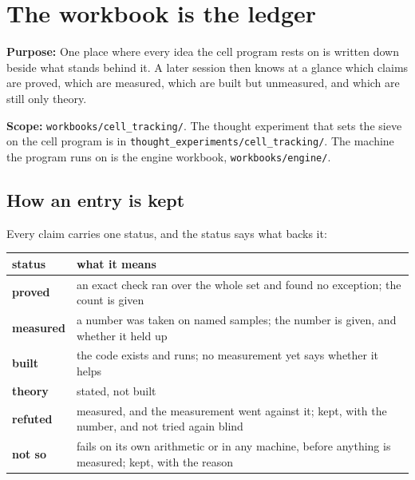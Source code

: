 \chapter{\texorpdfstring{The workbook is the ledger}{The workbook is the ledger}}
\label{chap:readme}

\textbf{Purpose:} One place where every idea the cell program rests on is written down beside what stands behind it. A later session then knows at a glance which claims are proved, which are measured, which are built but unmeasured, and which are still only theory.

\textbf{Scope:} \texttt{workbooks/\allowbreak{}cell\_\allowbreak{}tracking/\allowbreak{}}. The thought experiment that sets the sieve on the cell program is in \texttt{thought\_\allowbreak{}experiments/\allowbreak{}cell\_\allowbreak{}tracking/\allowbreak{}}. The machine the program runs on is the engine workbook, \texttt{workbooks/\allowbreak{}engine/\allowbreak{}}.

\section{\texorpdfstring{How an entry is kept}{How an entry is kept}}

Every claim carries one status, and the status says what backs it:

{\small
\setlength{\tabcolsep}{6pt}
\begin{longtable}{>{\RaggedRight\arraybackslash}p{}>{\RaggedRight\arraybackslash}p{}}
\toprule
status & what it means \\
\midrule
\endhead
\textbf{proved} & an exact check ran over the whole set and found no exception; the count is given \\
\textbf{measured} & a number was taken on named samples; the number is given, and whether it held up \\
\textbf{built} & the code exists and runs; no measurement yet says whether it helps \\
\textbf{theory} & stated, not built \\
\textbf{refuted} & measured, and the measurement went against it; kept, with the number, and not tried again blind \\
\textbf{not so} & fails on its own arithmetic or in any machine, before anything is measured; kept, with the reason \\
\bottomrule
\end{longtable}
}

